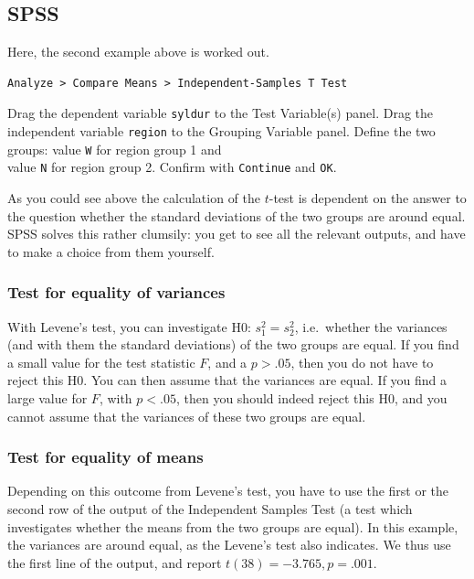 \documentclass[
]{book}
\begin{document}
\hypertarget{sec:SPSS-ttest-unpaired}{%
\subsection{SPSS}\label{sec:SPSS-ttest-unpaired}}

Here, the second example above is worked out.

\begin{verbatim}
Analyze > Compare Means > Independent-Samples T Test
\end{verbatim}

Drag the dependent variable \texttt{syldur} to the Test Variable(s) panel.
Drag the independent variable \texttt{region} to the Grouping
Variable panel. Define the two groups: value \texttt{W} for region group 1 and\\
value \texttt{N} for region group 2. Confirm with \texttt{Continue} and \texttt{OK}.

As you could see above the calculation of the \(t\)-test is dependent on the
answer to the question whether the standard deviations of the two groups
are around equal. SPSS solves this rather clumsily: you get to see all the
relevant outputs, and have to make a choice from them yourself.

\hypertarget{test-for-equality-of-variances}{%
\subsubsection{Test for equality of variances}\label{test-for-equality-of-variances}}

With Levene's test, you can investigate H0: \(s^2_1 = s^2_2\), i.e.~whether
the variances (and with them the standard deviations) of the two groups
are equal. If you find a small value for the test statistic \(F\),
and a \(p>.05\), then you do not have to reject this H0. You can then assume
that the variances are equal. If you find a large value for \(F\),
with \(p<.05\), then you should indeed reject this H0, and you cannot
assume that the variances of these two groups are equal.

\hypertarget{test-for-equality-of-means}{%
\subsubsection{Test for equality of means}\label{test-for-equality-of-means}}

Depending on this outcome from Levene's test, you have to use the first
or the second row of the output of the Independent Samples Test
(a test which investigates whether the means from the two groups are equal).
In this example, the variances are around equal, as the
Levene's test also indicates. We thus use the first line of the output,
and report \(t(38)=-3.765, p=.001\).
\end{document}
